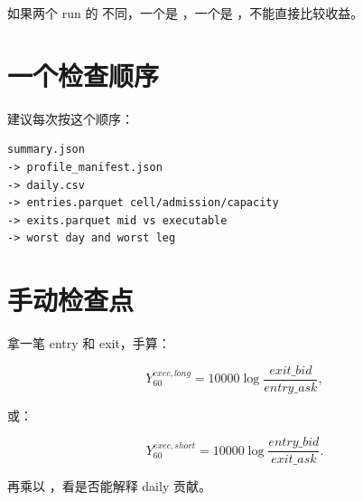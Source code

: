 如果两个 run 的  不同，一个是 ，一个是 ，不能直接比较收益。

\section{一个检查顺序}

建议每次按这个顺序：

\begin{lstlisting}
summary.json
-> profile_manifest.json
-> daily.csv
-> entries.parquet cell/admission/capacity
-> exits.parquet mid vs executable
-> worst day and worst leg
\end{lstlisting}

\section{手动检查点}

拿一笔 entry 和 exit，手算：

\[
Y^{exec,long}_{60}=10000\log\frac{exit\_bid}{entry\_ask},
\]

或：

\[
Y^{exec,short}_{60}=10000\log\frac{entry\_bid}{exit\_ask}.
\]

再乘以 ，看是否能解释 daily 贡献。

